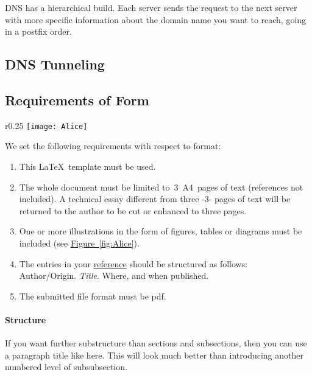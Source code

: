 \documentclass[a4paper,11pt]{article}
\begin{document}
DNS has a hierarchical build. Each server sends the request to the next server with more specific information about the domain name you want to reach, going in a postfix order. 



\subsection{DNS Tunneling}





\subsection{Requirements of Form}

\begin{wrapfigure}[10]{r}{0.25\textwidth}
  \centering
  \texttt{[image: Alice]} %
  \vspace{-0.2cm}
  \caption{A ``wrapped'' figure with the text.}
  \label{fig:Alice}
\end{wrapfigure}

We set the following requirements with respect to format:
\begin{enumerate}
	\item This \LaTeX\ template must be used.
	\item The whole document must be limited to~3~A4~pages of text (references not included).  A technical essay different from three -3- pages of text will be returned to the author
to be cut or enhanced to three pages.
	\item One or more illustrations in the form of figures, tables or diagrams must be included (see \hyperref[fig:Alice]{Figure~\ref*{fig:Alice}}).
	\item The entries in your \hyperref[sec:references]{reference} should be structured as follows:\\
	Author/Origin. \textit{Title}. Where, and when published.
	\item The submitted file format must be pdf.
\end{enumerate}


\paragraph{Structure}  If you want  further substructure than sections and subsections, then you can use
a paragraph title like here.  This will look much better than introducing another numbered level of subsubsection.
\end{document}
